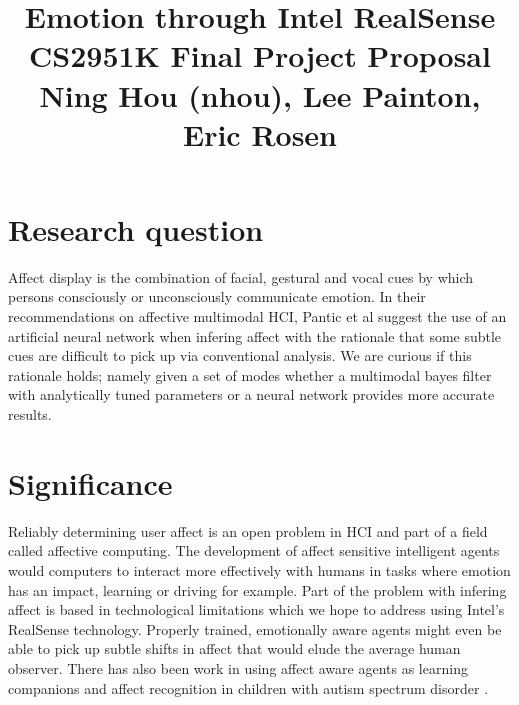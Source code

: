 \documentclass[12pt,letterpaper]{article}
\begin{document}
\title{Emotion through Intel RealSense\\ \vspace{2 mm} {\large CS2951K Final Project Proposal}\\ {\large Ning Hou (nhou), Lee Painton, Eric Rosen}}

\maketitle

\section{Research question}
Affect display is the combination of facial, gestural and vocal cues by which persons consciously or unconsciously communicate emotion.  In their recommendations on affective multimodal HCI, Pantic et al \cite[p.3]{pantic2005affective} suggest the use of an artificial neural network when infering affect with the rationale that some subtle cues are difficult to pick up via conventional analysis.  We are curious if this rationale holds; namely given a set of modes whether a multimodal bayes filter with analytically tuned parameters or a neural network provides more accurate results.

\section{Significance}
Reliably determining user affect is an open problem in HCI and part of a field called affective computing.  The development of affect sensitive intelligent agents would computers to interact more effectively with humans in tasks where emotion has an impact, learning or driving for example.  Part of the problem with infering affect is based in technological limitations which we hope to address using Intel's RealSense technology.  Properly trained, emotionally aware agents might even be able to pick up subtle shifts in affect that would elude the average human observer.  There has also been work in using affect aware agents as learning companions \cite{kapoor2001towards} and affect recognition in children with autism spectrum disorder \cite{liu2007affect}.

\end{document}
